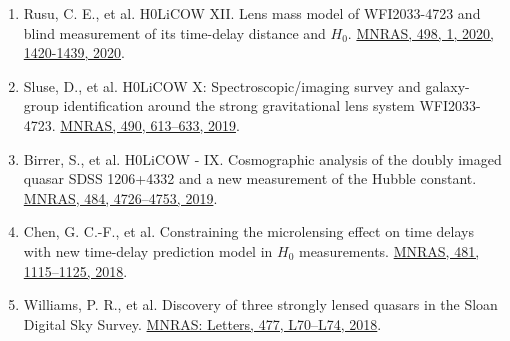 \documentclass[margin, line]{res}
\begin{document}
\begin{resume}
\begin{enumerate}
	\item Rusu, C. E., et al. H0LiCOW XII. Lens mass model of WFI2033-4723 and blind measurement of its time-delay distance and $H_0$. \href{http://adsabs.harvard.edu/abs/2019arXiv190509338R}{MNRAS, 498, 1, 2020, 1420-1439, 2020}.
	\item Sluse, D., et al. H0LiCOW X: Spectroscopic/imaging survey and galaxy-group identification around the strong gravitational lens system WFI2033-4723. \href{https://academic.oup.com/mnras/article/doi/10.1093/mnras/stz2483/5561514/}{MNRAS, 490, 613--633, 2019}.
	\item Birrer, S., et al. H0LiCOW - IX. Cosmographic analysis of the doubly imaged quasar SDSS 1206+4332 and a new measurement of the Hubble constant. \href{https://doi.org/10.1093/mnras/stz200}{MNRAS, 484, 4726--4753, 2019}.
	\item Chen, G. C.-F., et al. Constraining the microlensing effect on time delays with new time-delay prediction model in $H_0$ measurements. \href{https://doi.org/10.1093/mnras/sty2350}{MNRAS, 481, 1115--1125, 2018}.
 	\item Williams, P. R., et al. Discovery of three strongly lensed quasars in the Sloan Digital Sky Survey. \href{https://doi.org/10.1093/mnrasl/sly043}{MNRAS: Letters, 477, L70--L74, 2018}.
\end{enumerate}


\end{resume}
\end{document}
